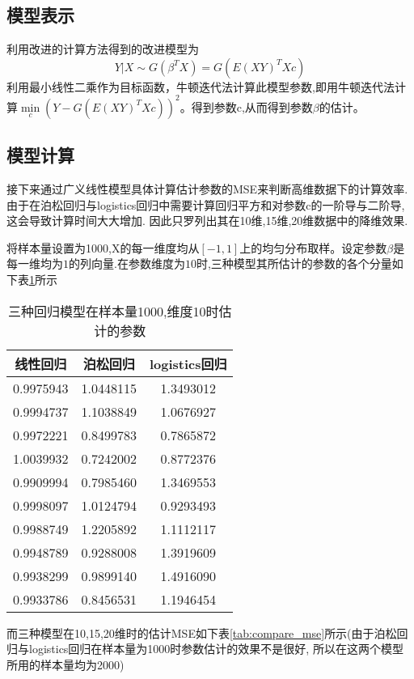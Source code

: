 \subsection{模型表示}
利用改进的计算方法得到的改进模型为
$$ Y|X \sim G(\beta^T X) = G(E(XY)^TXc)$$
利用最小线性二乘作为目标函数，牛顿迭代法计算此模型参数,即用牛顿迭代法计算$\min\limits_{c} (Y-G(E(XY)^TXc))^2$。得到参数c,从而得到参数$\beta$的估计。\\


\subsection{模型计算}

接下来通过广义线性模型具体计算估计参数的MSE来判断高维数据下的计算效率.由于在泊松回归与logistics回归中需要计算回归平方和对参数c的一阶导与二阶导,这会导致计算时间大大增加.
因此只罗列出其在10维,15维,20维数据中的降维效果.


将样本量设置为1000,X的每一维度均从$[-1,1]$上的均匀分布取样。设定参数$\beta$是每一维均为$1$的列向量.在参数维度为$10$时,三种模型其所估计的参数的各个分量如下表\ref{tab:compare}所示
\begin{table}[htbp]
    \centering
    \caption{三种回归模型在样本量1000,维度10时估计的参数}
    \label{tab:compare}
    \begin{tabular}{c|c|c}
    \hline
    线性回归      & 泊松回归      & logistics回归 \\ \hline
    0.9975943 & 1.0448115 & 1.3493012   \\ \hline
    0.9994737 & 1.1038849 & 1.0676927   \\ \hline
    0.9972221 & 0.8499783 & 0.7865872   \\ \hline
    1.0039932 & 0.7242002 & 0.8772376   \\ \hline
    0.9909994 & 0.7985460 & 1.3469553   \\ \hline
    0.9998097 & 1.0124794 & 0.9293493   \\ \hline
    0.9988749 & 1.2205892 & 1.1112117   \\ \hline
    0.9948789 & 0.9288008 & 1.3919609   \\ \hline
    0.9938299 & 0.9899140 & 1.4916090   \\ \hline
    0.9933786 & 0.8456531 & 1.1946454   \\ \hline
    \end{tabular}
\end{table}

而三种模型在10,15,20维时的估计MSE如下表\ref{tab:compare_mse}所示(由于泊松回归与logistics回归在样本量为1000时参数估计的效果不是很好,
所以在这两个模型所用的样本量均为2000)

